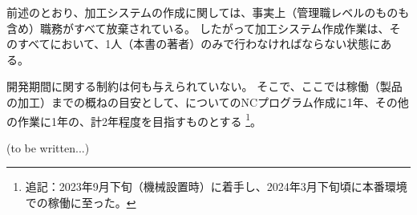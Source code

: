 




前述のとおり、加工システムの作成に関しては、事実上（管理職レベルのものも含め）職務がすべて放棄されている。
したがって加工システム作成作業は、そのすべてにおいて、1人（本書の著者）のみで行わなければならない状態にある。



開発期間に関する制約は何も与えられていない。
そこで、ここでは稼働（製品の加工）までの概ねの目安として、\Dimple についてのNCプログラム作成に1年、その他の作業に1年の、計2年程度を目指すものとする
\footnote{追記：2023年9月下旬（機械設置時）に着手し、2024年3月下旬頃に本番環境での稼働に至った。}。



(to be written...)

